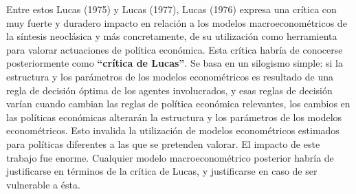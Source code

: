 \documentclass{nuevotema}
\begin{document}
Entre estos Lucas (1975) y Lucas (1977), Lucas (1976) expresa una crítica con muy fuerte y duradero impacto en relación a los modelos macroeconométricos de la síntesis neoclásica y más concretamente, de su utilización como herramienta para valorar actuaciones de política económica. Esta crítica habría de conocerse posteriormente como \textbf{``crítica de Lucas''}. Se basa en un silogismo simple: si la estructura y los parámetros de los modelos econométricos es resultado de una regla de decisión óptima de los agentes involucrados, y esas reglas de decisión varían cuando cambian las reglas de política económica relevantes, los cambios en las políticas económicas alterarán la estructura y los parámetros de los modelos econométricos. Esto invalida la utilización de modelos econométricos estimados para políticas diferentes a las que se pretenden valorar. El impacto de este trabajo fue enorme. Cualquier modelo macroeconométrico posterior habría de justificarse en términos de la crítica de Lucas, y justificarse en caso de ser vulnerable a ésta. 
\end{document}
